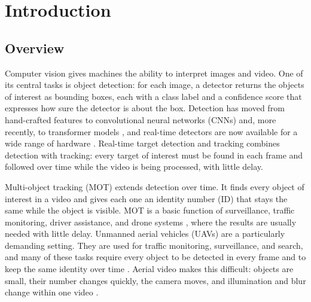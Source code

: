 \chapter{Introduction}\label{ch:intro}

\section{Overview}\label{sec:intro-overview}
Computer vision gives machines the ability to interpret images and video. One of its central tasks is object detection: for each image, a detector returns the objects of interest as bounding boxes, each with a class label and a confidence score that expresses how sure the detector is about the box. Detection has moved from hand-crafted features to convolutional neural networks (CNNs) and, more recently, to transformer models \cite{li2025motreview,ren2017fasterrcnn,redmon2016yolo,carion2020detr}, and real-time detectors are now available for a wide range of hardware \cite{ismail2026realtime}. Real-time target detection and tracking combines detection with tracking: every target of interest must be found in each frame and followed over time while the video is being processed, with little delay.

Multi-object tracking (MOT) extends detection over time. It finds every object of interest in a video and gives each one an identity number (ID) that stays the same while the object is visible. MOT is a basic function of surveillance, traffic monitoring, driver assistance, and drone systems \cite{zhu2022visdrone,wu2022uavsurvey,geiger2012kitti}, where the results are usually needed with little delay. Unmanned aerial vehicles (UAVs) are a particularly demanding setting. They are used for traffic monitoring, surveillance, and search, and many of these tasks require every object to be detected in every frame and to keep the same identity over time \cite{wu2022uavsurvey,zhu2022visdrone}. Aerial video makes this difficult: objects are small, their number changes quickly, the camera moves, and illumination and blur change within one video \cite{zhu2022visdrone,du2018uavdt,cheng2023smallobject}.

